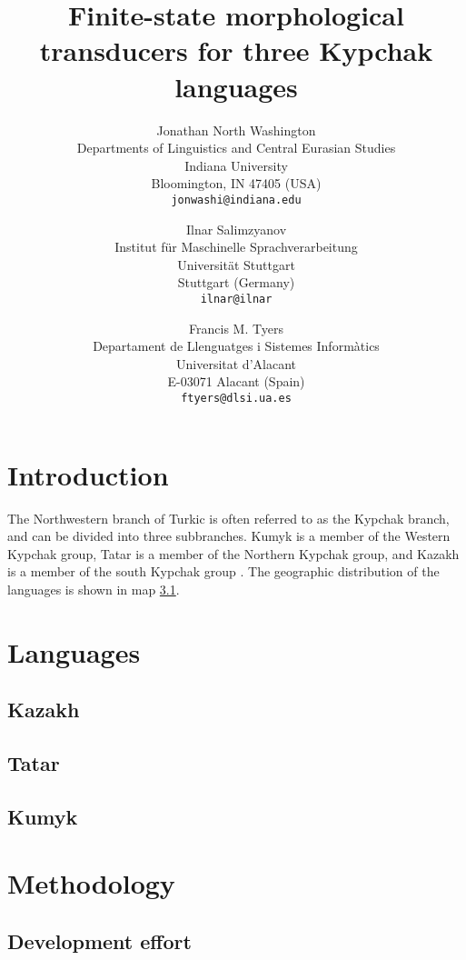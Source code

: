 \documentclass[a4paper,11pt,twocolumn]{article}
\title{Finite-state morphological transducers for three Kypchak languages}
\author{Jonathan North Washington \\
Departments of Linguistics and Central Eurasian Studies\\
Indiana University\\
Bloomington, IN 47405 (USA)\\
\texttt{jonwashi@indiana.edu} \and
Ilnar Salimzyanov  \\
Institut für Maschinelle Sprachverarbeitung \\
Universität Stuttgart\\
Stuttgart (Germany) \\
\texttt{ilnar@ilnar} \and 
Francis M. Tyers\\
Departament de Llenguatges i Sistemes Informàtics \\  
Universitat d'Alacant\\
E-03071 Alacant (Spain)\\
\texttt{ftyers@dlsi.ua.es} 
}
\begin{document}
\maketitleabstract{}

\section{Introduction}

The Northwestern branch of Turkic is often referred to as the Kypchak branch, and can be divided into three subbranches.  Kumyk is a member of the Western Kypchak group, Tatar is a member of the Northern Kypchak group, and Kazakh is a member of the south Kypchak group \citep[82-83]{histofturkic}.  The geographic distribution of the languages is shown in map \ref{}.

\cite{washington2012}
\cite{salimzyanov2013}
\cite{bekmanova2013}

\section{Languages}

\subsection{Kazakh}

\subsection{Tatar}

\subsection{Kumyk}

\cite{bammatov1960}
\cite{olmesov2000}

\section{Methodology}



\subsection{Development effort}
\end{document}
